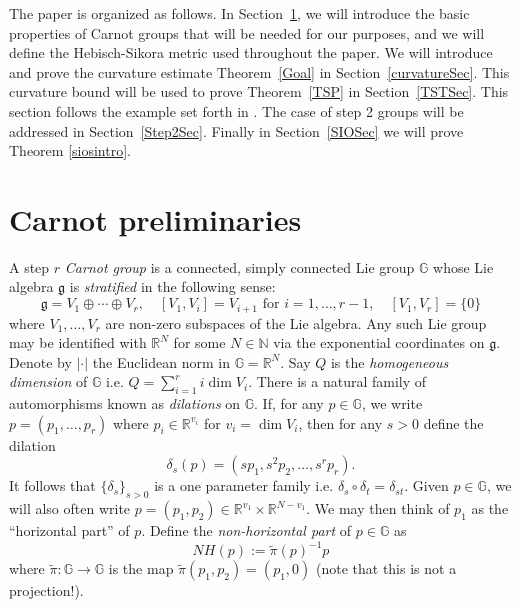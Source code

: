 \documentclass[11pt]{amsart}
\theoremstyle{definition}
\numberwithin{theorem}{section} \numberwithin{equation}{section}
\begin{document}
The paper is organized as follows.
In Section~\ref{CarnotSec}, we will introduce the basic properties of Carnot groups that will be needed for our purposes,
and we will define the Hebisch-Sikora metric used throughout the paper.
We will introduce and prove the curvature estimate Theorem~\ref{Goal} in Section~\ref{curvatureSec}.
This curvature bound will be used to prove Theorem~\ref{TSP} in Section~\ref{TSTSec}.
This section follows the example set forth in \cite{LiSchul}.
The case of step 2 groups will be addressed in Section~\ref{Step2Sec}. Finally in Section~\ref{SIOSec} we will prove Theorem \ref{siosintro}.















\section{Carnot preliminaries}
\label{CarnotSec}

A step $r$ \emph{Carnot group} is a connected, simply connected Lie group $\mathbb{G}$ 
whose Lie algebra $\mathfrak{g}$ is \emph{stratified} in the following sense:
$$
\mathfrak{g} = V_1 \oplus \cdots \oplus V_r, 
\quad [V_1,V_i] = V_{i+1}  \text{ for } i=1,\dots,r-1,
\quad [V_1,V_r] =\{0\}
$$
where $V_1,\dots,V_r$ are non-zero subspaces of the Lie algebra.
Any such Lie group may be identified with $\mathbb{R}^N$ for some $N \in \mathbb{N}$ via the exponential coordinates on $\mathfrak{g}$.
Denote by $|\cdot|$ the Euclidean norm in $\mathbb{G} = \mathbb{R}^N$.
Say $Q$ is the \emph{homogeneous dimension} of $\mathbb{G}$ 
i.e. $Q = \sum_{i=1}^r i \dim V_i$.
There is a natural family of automorphisms known as \emph{dilations} on $\mathbb{G}$.
If, for any $p \in \mathbb{G}$, we write $p = (p_1,\dots,p_r)$ where
$p_i \in \mathbb{R}^{v_i}$ for $v_i = \dim V_i$,
then for any $s>0$ define the dilation
$$
\delta_s(p) = \left( sp_1,s^{2}p_2, \dots, s^{r}p_r \right).
$$
It follows that $\{\delta_s\}_{s>0}$ is a one parameter family
i.e. $\delta_s \circ \delta_t = \delta_{st}$.
Given $p \in \mathbb{G}$, 
we will also often write $p = (p_1,p_2) \in \mathbb{R}^{v_1} \times \mathbb{R}^{N-v_1}$.
We may then think of $p_1$ as the ``horizontal part'' of $p$.
Define the \emph{non-horizontal part} of $p \in \mathbb{G}$ as 
$$
NH(p) := \tilde{\pi}(p)^{-1}p
$$
where $\tilde{\pi}:\mathbb{G} \to \mathbb{G}$ is the map $\tilde{\pi}(p_1,p_2) = (p_1,0)$ (note that this is not a projection!).
\end{document}
